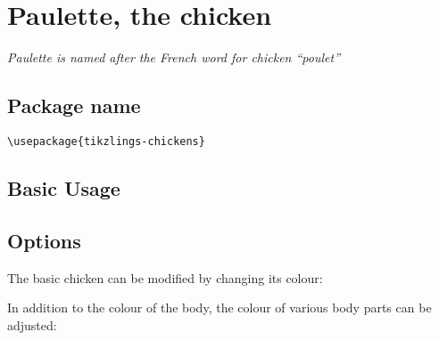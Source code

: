 \documentclass[parskip=half]{scrartcl}
\begin{document}
\section[Chicken]{Paulette, the chicken}

\emph{Paulette is named after the French word for chicken ``poulet''}

\subsection{Package name}

\begin{tcolorbox}[lower separated=false, lefthand width=.8\linewidth]
\vspace*{0.5cm}
\lstinline|\usepackage{tikzlings-chickens}| 
\vspace*{0.5cm}
\end{tcolorbox}

\subsection{Basic Usage}

\begin{tcblisting}{}
\chicken
\end{tcblisting}

\subsection{Options}

The basic chicken can be modified by changing its colour:
\begin{tcblisting}{}
\chicken[body=blue]
\end{tcblisting}

In addition to the colour of the body, the colour of various body parts can be adjusted:
\begin{tcblisting}{}
\chicken[comb=green]
\end{tcblisting}

\begin{tcblisting}{}
\chicken[eye=red]
\end{tcblisting}

\begin{tcblisting}{}
\chicken[pupil=red]
\end{tcblisting}

\begin{tcblisting}{}
\chicken[bill=red]
\end{tcblisting}
\end{document}
